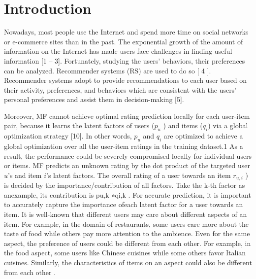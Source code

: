 \documentclass[10pt,conference]{IEEEtran}
\begin{document}
\section{Introduction}


Nowadays, most people use the Internet and spend more time on social networks or e-commerce
sites than in the past. The exponential growth of the amount of information on the Internet has
made users face challenges in finding useful information [1 – 3]. Fortunately, studying the users’
behaviors, their preferences can be analyzed. Recommender systems (RS) are used to do so [ 4 ].
Recommender systems adopt to provide recommendations to each user based on their activity,
preferences, and behaviors which are consistent with the users’ personal preferences and assist them
in decision-making [5].


Moreover, MF cannot achieve optimal rating prediction locally for each user-item pair, because it learns the latent factors of users ($p_u$ ) and items ($q_i$) via a global optimization strategy [10]. In other words, $p_u$ and $q_i$ are optimized to achieve a global optimization over all the user-item ratings in the training dataset.1 As a result, the performance could be severely compromised locally for individual users or items. MF predicts an unknown rating by the dot product of the targeted user $u$'s and item $i$'s latent factors. The overall rating of a user towards an item $r_{u,i}$ ) is decided by the importance/contribution of all factors. Take the k-th factor as anexample, its contribution is pu,k ∗qi,k . For accurate prediction, it is important to accurately capture the importance ofeach latent factor for a user towards an item. It is well-known that different users may care about different aspects of an item. For example, in the domain of restaurants, some users care more about the taste of food while others pay more attention to the ambience. Even for the same aspect, the preference of users could be different from each other. For example, in the food aspect, some users like Chinese cuisines while some others favor Italian cuisines. Similarly, the characteristics of items on an aspect could also be different from each other \cite{}.
\end{document}
